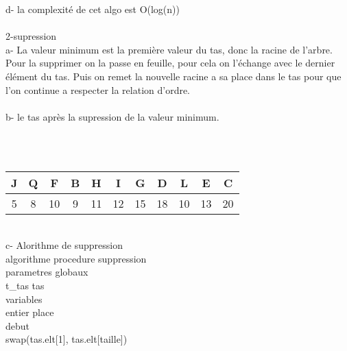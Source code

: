 \documentclass [11pt]{report}
\begin{document}
d- la complexit\'e de cet algo est O(log(n))\\
\vspace{7.5mm}\\
2-supression\\
\indent a- La valeur minimum est la premi\`ere valeur du tas, donc la racine de l'arbre. Pour la supprimer on la passe en feuille, pour cela on l'\'echange avec le dernier \'el\'ement du tas. Puis on remet la nouvelle racine a sa place dans le tas pour que l'on continue a respecter la relation d'ordre. \\
\vspace{5mm}\\
\indent b- le tas apr\`es la supression de la valeur minimum.\\
\\
\vspace{2mm}\\
\begin{tabular}{|c|c|c|c|c|c|c|c|c|c|c|}
\hline J & Q & F  & B & H  & I  & G  &  D & L  & E  & C \\ 
\hline 5 & 8 & 10 & 9 & 11 & 12 & 15 & 18 & 10 & 13 & 20 \\ 
\hline 
\end{tabular} \\
\newpage
 c- Alorithme de suppression \\
algorithme procedure suppression\\
\indent parametres globaux \\
\indent \indent t\_tas tas\\
\indent variables\\
\indent \indent entier place\\
debut \\
\indent swap(tas.elt[1], tas.elt[taille])\\
\end{document}
